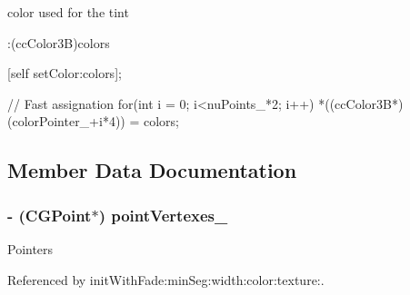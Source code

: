 color used for the tint 
\begin{DoxyCode}
                      :(ccColor3B)colors
{
    [self setColor:colors];

    // Fast assignation
    for(int i = 0; i<nuPoints_*2; i++)
        *((ccColor3B*) (colorPointer_+i*4)) = colors;
}
\end{DoxyCode}


\subsection{Member Data Documentation}
\hypertarget{interface_c_c_motion_streak_a58ea167294acf31a90d555a2d0e786ca}{
\subsubsection[{point\-Vertexes\-\_\-}]{\setlength{\rightskip}{0pt plus 5cm}-\/ (C\-G\-Point$\ast$) {\bf point\-Vertexes\-\_\-}}}\label{interface_c_c_motion_streak_a58ea167294acf31a90d555a2d0e786ca}
Pointers 

Referenced by init\-With\-Fade\-:min\-Seg\-:width\-:color\-:texture\-:.



